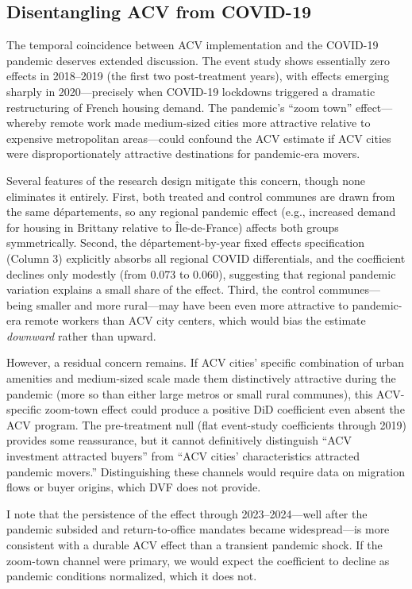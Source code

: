 \documentclass[12pt]{article}
\begin{document}
\subsection{Disentangling ACV from COVID-19}

The temporal coincidence between ACV implementation and the COVID-19 pandemic deserves extended discussion. The event study shows essentially zero effects in 2018--2019 (the first two post-treatment years), with effects emerging sharply in 2020---precisely when COVID-19 lockdowns triggered a dramatic restructuring of French housing demand. The pandemic's ``zoom town'' effect---whereby remote work made medium-sized cities more attractive relative to expensive metropolitan areas---could confound the ACV estimate if ACV cities were disproportionately attractive destinations for pandemic-era movers.

Several features of the research design mitigate this concern, though none eliminates it entirely. First, both treated and control communes are drawn from the same d\'{e}partements, so any regional pandemic effect (e.g., increased demand for housing in Brittany relative to \^{I}le-de-France) affects both groups symmetrically. Second, the d\'{e}partement-by-year fixed effects specification (Column 3) explicitly absorbs all regional COVID differentials, and the coefficient declines only modestly (from 0.073 to 0.060), suggesting that regional pandemic variation explains a small share of the effect. Third, the control communes---being smaller and more rural---may have been even more attractive to pandemic-era remote workers than ACV city centers, which would bias the estimate \textit{downward} rather than upward.

However, a residual concern remains. If ACV cities' specific combination of urban amenities and medium-sized scale made them distinctively attractive during the pandemic (more so than either large metros or small rural communes), this ACV-specific zoom-town effect could produce a positive DiD coefficient even absent the ACV program. The pre-treatment null (flat event-study coefficients through 2019) provides some reassurance, but it cannot definitively distinguish ``ACV investment attracted buyers'' from ``ACV cities' characteristics attracted pandemic movers.'' Distinguishing these channels would require data on migration flows or buyer origins, which DVF does not provide.

I note that the persistence of the effect through 2023--2024---well after the pandemic subsided and return-to-office mandates became widespread---is more consistent with a durable ACV effect than a transient pandemic shock. If the zoom-town channel were primary, we would expect the coefficient to decline as pandemic conditions normalized, which it does not.
\end{document}
